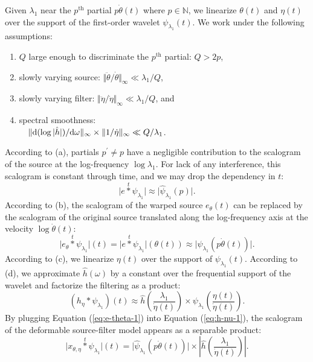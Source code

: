 \documentclass[twoside,a4paper]{article}
\begin{document}
Given $\lambda_1$ near the $p^{\textrm{th}}$ partial $p \dot{\theta}(t)$ where $p \in \mathbb{N}$, we linearize $\theta(t)$ and $\eta(t)$ over the support of the first-order wavelet $\psi_{\lambda_1}(t)$. We work under the following assumptions:
\renewcommand{\labelenumi}{(\alph{enumi})}
\begin{enumerate}
\item $Q$ large enough to discriminate the $p^\text{th}$ partial: $Q>2p$,
\item slowly varying source: $\Vert\ddot{\theta}/\dot{\theta}\Vert_{\infty} \ll \lambda_{1}/Q$,
\item slowly varying filter: $\Vert\ddot{\eta}/\dot{\eta}\Vert_{\infty}\ll\lambda_{1}/Q$, and
\item spectral smoothness: \\
$\hphantom{\quad} \Vert\mathrm{d}( \log \vert \hat{h} \vert ) / \mathrm{d} \omega \Vert_{\infty} \times \Vert 1 / \dot{\eta} \Vert_{\infty} \ll Q / \lambda_{1}$.
\end{enumerate}
According to (a), partials $p^{\prime} \neq p$ have a negligible contribution to the scalogram of the source at the log-frequency $\log \lambda_1$. For lack of any interference, this scalogram is constant through time, and we may drop the dependency in $t$:
\begin{equation}
\vert e \overset{t}{\ast} \psi_{\lambda_1} \vert \approx
\vert \widehat{\psi}_{\lambda_1}(p) \vert.
\end{equation}
According to (b), the scalogram of the warped source $e_\theta (t)$ can be replaced by the scalogram of the original source translated along the log-frequency axis at the velocity $\log \dot{\theta}(t)$:
\begin{equation}
\vert e_{\theta} \overset{t}{\ast} \psi_{\lambda_1} \vert (t) =
\vert e \overset{t}{\ast} \psi_{\lambda_1} \vert (\theta(t)) \approx
\vert \widehat{\psi}_{\lambda_1}(p \dot{\theta}(t)) \vert.
\label{eq:e-theta-1}
\end{equation}
According to (c), we linearize $\eta(t)$ over the support of $\psi_{\lambda_1}(t)$. According to (d), we approximate $\hat{h}(\omega)$ by a constant over the frequential support of the wavelet and factorize the filtering as a product:
\begin{equation}
\left( h_\eta \ast \psi_{\lambda_1} \right)(t) \approx
\hat{h}\left(\frac{\lambda_1}{\dot{\eta}(t)}\right)
\times
\psi_{\lambda_1}\left( \frac{\eta(t)}{\dot{\eta}(t)} \right).
\label{eq:h-nu-1}
\end{equation}
By plugging Equation (\ref{eq:e-theta-1}) into Equation (\ref{eq:h-nu-1}), the scalogram of the deformable source-filter model appears as a separable product:
\begin{equation}
\vert x_{\theta,\eta} \overset{t}{\ast} \psi_{\lambda_1} \vert (t) =
\vert \widehat{\psi}_{\lambda_1}(p \dot{\theta}(t)) \vert
\times
\left \vert \hat{h}\left(\frac{\lambda_1}{\dot{\eta}(t)}\right) \right \vert.
\label{eq:factorization}
\end{equation}
\end{document}

